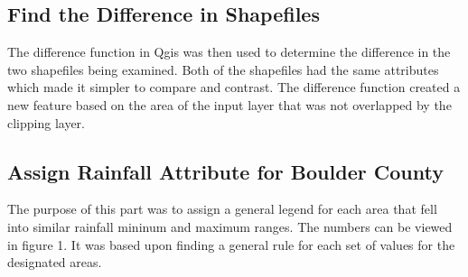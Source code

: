 \documentclass[twoside]{article}
\begin{document}
\begin{multicols}{2}
\subsection{Find the Difference in Shapefiles}
The difference function in Qgis was then used to determine the difference in the two shapefiles being examined. Both of the shapefiles had the same attributes which made it simpler to compare and contrast. The difference function created a new feature based on the area of the input layer that was not overlapped by the clipping layer.



\subsection{Assign Rainfall Attribute for Boulder County}
The purpose of this part was to assign a general legend for each area that fell into similar rainfall mininum and maximum ranges. The numbers can be viewed in figure 1. It was based upon finding a general rule for each set of values for the designated areas. 



\end{multicols}
\end{document}
